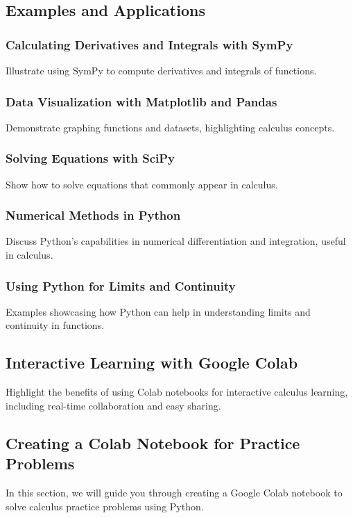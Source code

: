 \documentclass[a4paper,12pt]{book}
\newcounter{problem}
\begin{document}
\subsection*{Examples and Applications}

\subsubsection*{Calculating Derivatives and Integrals with SymPy}
Illustrate using SymPy to compute derivatives and integrals of functions.

\subsubsection*{Data Visualization with Matplotlib and Pandas}
Demonstrate graphing functions and datasets, highlighting calculus concepts.

\subsubsection*{Solving Equations with SciPy}
Show how to solve equations that commonly appear in calculus.

\subsubsection*{Numerical Methods in Python}
Discuss Python's capabilities in numerical differentiation and integration, useful in calculus.

\subsubsection*{Using Python for Limits and Continuity}
Examples showcasing how Python can help in understanding limits and continuity in functions.

\subsection*{Interactive Learning with Google Colab}
Highlight the benefits of using Colab notebooks for interactive calculus learning, including real-time collaboration and easy sharing.


\subsection*{Creating a Colab Notebook for Practice Problems}

In this section, we will guide you through creating a Google Colab notebook to solve calculus practice problems using Python.
\end{document}
